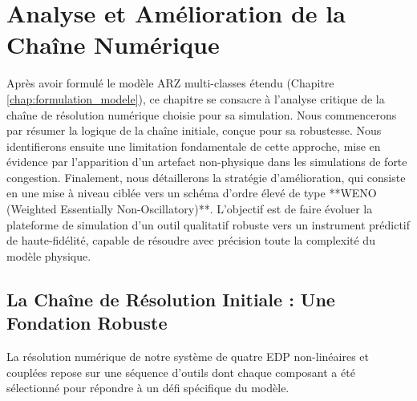 

\chapter{Analyse et Amélioration de la Chaîne Numérique}
\label{chap:analyse_amelioration_numerique}

Après avoir formulé le modèle ARZ multi-classes étendu (Chapitre \ref{chap:formulation_modele}), ce chapitre se consacre à l'analyse critique de la chaîne de résolution numérique choisie pour sa simulation. Nous commencerons par résumer la logique de la chaîne initiale, conçue pour sa robustesse. Nous identifierons ensuite une limitation fondamentale de cette approche, mise en évidence par l'apparition d'un artefact non-physique dans les simulations de forte congestion. Finalement, nous détaillerons la stratégie d'amélioration, qui consiste en une mise à niveau ciblée vers un schéma d'ordre élevé de type **WENO (Weighted Essentially Non-Oscillatory)**. L'objectif est de faire évoluer la plateforme de simulation d'un outil qualitatif robuste vers un instrument prédictif de haute-fidélité, capable de résoudre avec précision toute la complexité du modèle physique.

\section{La Chaîne de Résolution Initiale : Une Fondation Robuste}
\label{sec:chaine_initiale}

La résolution numérique de notre système de quatre EDP non-linéaires et couplées repose sur une séquence d'outils dont chaque composant a été sélectionné pour répondre à un défi spécifique du modèle.

